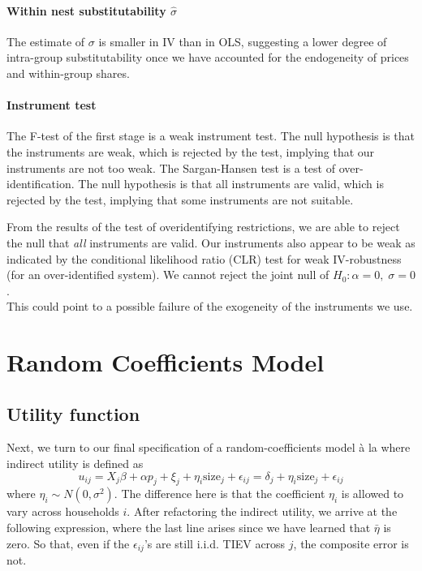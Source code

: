 \documentclass[12pt]{article}[margin=1in]
\begin{document}
\paragraph{Within nest substitutability $\hat{\sigma}$} The estimate of $\sigma$ is smaller in IV than in OLS, suggesting a lower degree of intra-group substitutability once we have accounted for the endogeneity of prices and within-group shares.

\paragraph{Instrument test}
The F-test of the first stage is a weak instrument test. The null hypothesis is
that the instruments are weak, which is rejected by the test, implying that our
instruments are not too weak. The Sargan-Hansen test is a test of
over-identification. The null hypothesis is that all instruments are valid,
which is rejected by the test, implying that some instruments are not suitable.

From the results of the test of overidentifying restrictions, we are able to
reject the null that \textit{all} instruments are valid. Our instruments also
appear to be weak as indicated by the conditional likelihood ratio (CLR) test
for weak IV-robustness (for an over-identified system). We cannot reject the
joint null of $H_0: \alpha=0, \; \sigma=0$. \\ This could point to a possible
failure of the exogeneity of the instruments we use.

\section{Random Coefficients Model}
\subsection{Utility function}
Next, we turn to our final specification of a random-coefficients model \`a la
\citet{berrylevinsohnpakes1995} where indirect utility is defined as
\begin{equation}
    u_{ij}=X_{j}\beta + \alpha p_{j} + \xi_{j} + \eta_i\text{size}_j + \epsilon_{ij} = \delta_j + \eta_i\text{size}_j + \epsilon_{ij}
\end{equation}
where $\eta_i \sim N(0,\sigma^2)$.
The difference here is that the coefficient $\eta_i$ is allowed to vary across
households $i$. After refactoring the indirect utility, we arrive at the
following expression, where the last line arises since we have learned that
$\bar{\eta}$ is zero. So that, even if the $\epsilon_{ij}$'s are still i.i.d.
TIEV across $j$, the composite error is not.
\end{document}
